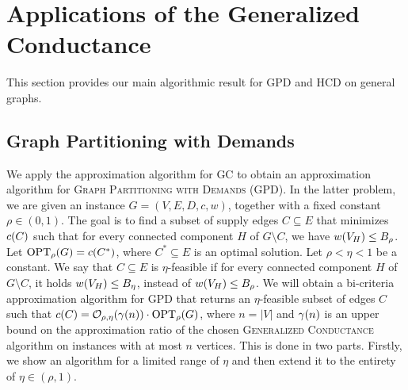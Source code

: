\section{Applications of the Generalized Conductance}
This section provides our main algorithmic result for GPD and HCD on general graphs.


\subsection{Graph Partitioning with Demands}

We apply the approximation algorithm for GC to obtain an approximation algorithm for \textsc{Graph Partitioning with Demands} (GPD). In the latter problem, we are given an instance $G=(V,E,D,c,w)$, together with a fixed constant $\rho\in(0,1)$. The goal is to find a subset of supply edges $C\subseteq E$ that minimizes $c\mathopen{}\left( C \right)$ such that for every connected component $H$ of $G\setminus C$, we have $w\mathopen{}\left( V_H \right)\leq B_\rho$.
Let $\textup{OPT}_{\rho}\mathopen{}\left( G \right)=c\mathopen{}\left( C^* \right)$, where $C^*\subseteq E$ is an optimal solution.
Let $\rho<\eta<1$ be a constant. We say that $C\subseteq E$ is $\eta$-feasible if for every connected component $H$ of $G\setminus C$, it holds $w\mathopen{}\left( V_H \right)\leq B_\eta$, instead of $w\mathopen{}\left( V_H \right)\leq B_\rho$.
We will obtain a bi-criteria approximation algorithm for GPD that returns an $\eta$-feasible subset of edges $C$ such that $c\mathopen{}\left( C \right)=\mathcal{O}_{\rho, \eta}\mathopen{}\left( \gamma\mathopen{}\left( n \right) \right)\cdot \textup{OPT}_{\rho}\mathopen{}\left( G \right)$, where $n=|V|$ and $\gamma\mathopen{}\left( n \right)$ is an upper bound on the approximation ratio of the chosen \textsc{Generalized Conductance} algorithm on instances with at most $n$ vertices. This is done in two parts. Firstly, we show an algorithm for a limited range of $\eta$ and then extend it to the entirety of $\eta\in(\rho,1)$.

